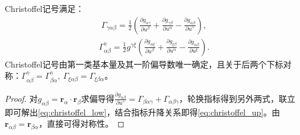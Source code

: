 \documentclass[../../main.tex]{subfiles}%
\begin{document}
\begin{proposition}
Christoffel记号满足：
\begin{align}
\Gamma_{\gamma\alpha\beta}=\frac{1}{2}\left(\frac{\partial g_{\alpha\gamma}}{\partial u^\beta}+\frac{\partial g_{\gamma\beta}}{\partial u^\alpha}-\frac{\partial g_{\alpha\beta}}{\partial u^\gamma}\right),\label{eq:christoffel_low}
\end{align}
\begin{align}
\Gamma^\gamma_{\alpha\beta}=\frac{1}{2}g^{\gamma\xi}\left(\frac{\partial g_{\alpha\xi}}{\partial u^\beta}+\frac{\partial g_{\xi\beta}}{\partial u^\alpha}-\frac{\partial g_{\alpha\beta}}{\partial u^\xi}\right).\label{eq:christoffel_up}
\end{align}
Christoffel记号由第一类基本量及其一阶偏导数唯一确定，且关于后两个下标对称：$\Gamma^\gamma_{\alpha\beta}=\Gamma^\gamma_{\beta\alpha},\ \Gamma_{\xi\alpha\beta}=\Gamma_{\xi\beta\alpha}$。
\end{proposition}
\begin{proof}
对$g_{\alpha\beta}=\boldsymbol{r}_\alpha\cdot\boldsymbol{r}_\beta$求偏导得$\frac{\partial g_{\alpha\beta}}{\partial u^\gamma}=\Gamma_{\beta\alpha\gamma}+\Gamma_{\alpha\beta\gamma}$，轮换指标得到另外两式，联立即可解出\eqref{eq:christoffel_low}，结合指标升降关系即得\eqref{eq:christoffel_up}。由$\boldsymbol{r}_{\alpha\beta}=\boldsymbol{r}_{\beta\alpha}$，直接可得对称性。
\end{proof}
\end{document}
